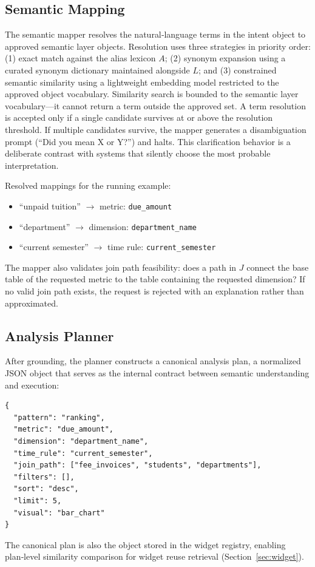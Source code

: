 \documentclass[11pt]{article}
\begin{document}
\subsection{Semantic Mapping}
The semantic mapper resolves the natural‑language terms in the intent object to approved semantic layer objects. Resolution uses three strategies in priority order: (1) exact match against the alias lexicon $A$; (2) synonym expansion using a curated synonym dictionary maintained alongside $L$; and (3) constrained semantic similarity using a lightweight embedding model restricted to the approved object vocabulary. Similarity search is bounded to the semantic layer vocabulary—it cannot return a term outside the approved set. A term resolution is accepted only if a single candidate survives at or above the resolution threshold. If multiple candidates survive, the mapper generates a disambiguation prompt (``Did you mean X or Y?'') and halts. This clarification behavior is a deliberate contrast with systems that silently choose the most probable interpretation.

Resolved mappings for the running example:
\begin{itemize}
  \item ``unpaid tuition'' $\rightarrow$ metric: \texttt{due\_amount}
  \item ``department'' $\rightarrow$ dimension: \texttt{department\_name}
  \item ``current semester'' $\rightarrow$ time rule: \texttt{current\_semester}
\end{itemize}
The mapper also validates join path feasibility: does a path in $J$ connect the base table of the requested metric to the table containing the requested dimension? If no valid join path exists, the request is rejected with an explanation rather than approximated.

\subsection{Analysis Planner}
After grounding, the planner constructs a canonical analysis plan, a normalized JSON object that serves as the internal contract between semantic understanding and execution:
\begin{verbatim}
{
  "pattern": "ranking",
  "metric": "due_amount",
  "dimension": "department_name",
  "time_rule": "current_semester",
  "join_path": ["fee_invoices", "students", "departments"],
  "filters": [],
  "sort": "desc",
  "limit": 5,
  "visual": "bar_chart"
}
\end{verbatim}
The canonical plan is also the object stored in the widget registry, enabling plan‑level similarity comparison for widget reuse retrieval (Section~\ref{sec:widget}).
\end{document}
